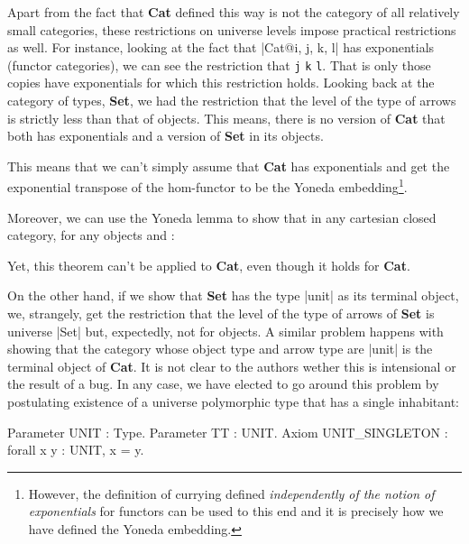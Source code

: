 \documentclass[9pt, twocolumn]{extarticle}
\begin{document}
Apart from the fact that \textbf{Cat} defined this way is not the category of all relatively small categories, these restrictions on universe levels impose practical restrictions as well.
For instance, looking at the fact that \Coqe|Cat@{i, j, k, l}| has exponentials (functor categories), we can see the restriction that \texttt{j}  \texttt{k}  \texttt{l}.
That is only those copies have exponentials for which this restriction holds.
Looking back at the category of types, \textbf{Set}, we had the restriction that the level of the type of arrows is strictly less than that of objects.
This means, there is no version of \textbf{Cat} that both has exponentials and a version of \textbf{Set} in its objects.

This means that we can't simply assume that \textbf{Cat} has exponentials and get the exponential transpose of the hom-functor to be the Yoneda embedding\footnote{However, the definition of currying defined \emph{independently of the notion of exponentials} for functors can be used to this end and it is precisely how we have defined the Yoneda embedding.}.

Moreover, we can use the Yoneda lemma to show that in any cartesian closed category, for any objects  and :

Yet, this theorem can't be applied to \textbf{Cat}, even though it holds for \textbf{Cat}.

On the other hand, if we show that \textbf{Set} has the type \Coqe|unit| as its terminal object, we, strangely, get the restriction that the level of the type of arrows of \textbf{Set} is universe \Coqe|Set| but, expectedly, not for objects.
A similar problem happens with showing that the category whose object type and arrow type are \Coqe|unit| is the terminal object of \textbf{Cat}.
It is not clear to the authors wether this is intensional or the result of a bug.
In any case, we have elected to go around this problem by postulating existence of a universe polymorphic type that has a single inhabitant:
\begin{Coq}
Parameter UNIT : Type.
Parameter TT : UNIT.
Axiom UNIT_SINGLETON : forall x y : UNIT, x = y.
\end{Coq}

{}
\nocite{*}

\end{document}
